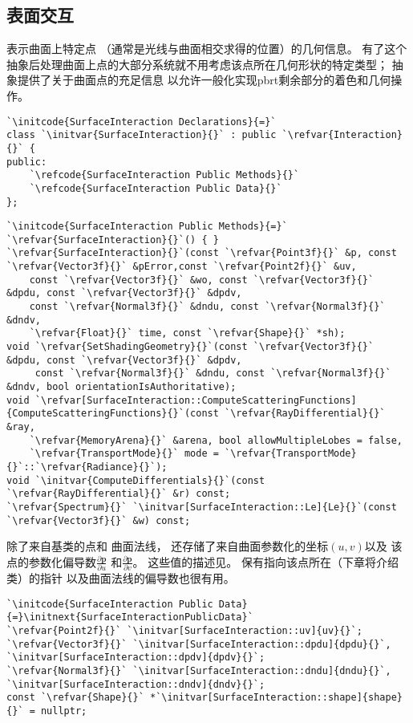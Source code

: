 \subsection{表面交互}\label{sub:表面交互}
表示曲面上特定点
（通常是光线与曲面相交求得的位置）的几何信息。
有了这个抽象后处理曲面上点的大部分系统就不用考虑该点所在几何形状的特定类型；
抽象提供了关于曲面点的充足信息
以允许一般化实现pbrt剩余部分的着色和几何操作。
\begin{lstlisting}
`\initcode{SurfaceInteraction Declarations}{=}`
class `\initvar{SurfaceInteraction}{}` : public `\refvar{Interaction}{}` {
public:
    `\refcode{SurfaceInteraction Public Methods}{}`
    `\refcode{SurfaceInteraction Public Data}{}`
};
\end{lstlisting}
\begin{lstlisting}
`\initcode{SurfaceInteraction Public Methods}{=}`
`\refvar{SurfaceInteraction}{}`() { }
`\refvar{SurfaceInteraction}{}`(const `\refvar{Point3f}{}` &p, const `\refvar{Vector3f}{}` &pError,const `\refvar{Point2f}{}` &uv,
    const `\refvar{Vector3f}{}` &wo, const `\refvar{Vector3f}{}` &dpdu, const `\refvar{Vector3f}{}` &dpdv,
    const `\refvar{Normal3f}{}` &dndu, const `\refvar{Normal3f}{}` &dndv,
    `\refvar{Float}{}` time, const `\refvar{Shape}{}` *sh);
void `\refvar{SetShadingGeometry}{}`(const `\refvar{Vector3f}{}` &dpdu, const `\refvar{Vector3f}{}` &dpdv,
     const `\refvar{Normal3f}{}` &dndu, const `\refvar{Normal3f}{}` &dndv, bool orientationIsAuthoritative);
void `\refvar[SurfaceInteraction::ComputeScatteringFunctions]{ComputeScatteringFunctions}{}`(const `\refvar{RayDifferential}{}` &ray,
    `\refvar{MemoryArena}{}` &arena, bool allowMultipleLobes = false,
    `\refvar{TransportMode}{}` mode = `\refvar{TransportMode}{}`::`\refvar{Radiance}{}`);
void `\initvar{ComputeDifferentials}{}`(const `\refvar{RayDifferential}{}` &r) const;
`\refvar{Spectrum}{}` `\initvar[SurfaceInteraction::Le]{Le}{}`(const `\refvar{Vector3f}{}` &w) const;
\end{lstlisting}

除了来自基类的点和
曲面法线，
还存储了来自曲面参数化的坐标$(u,v)$以及
该点的参数化偏导数$\displaystyle\frac{\partial \bm p}{\partial u}$
和$\displaystyle\frac{\partial \bm p}{\partial v}$。
这些值的描述见。
保有指向该点所在（下章将介绍类）的指针
以及曲面法线的偏导数也很有用。
\begin{lstlisting}
`\initcode{SurfaceInteraction Public Data}{=}\initnext{SurfaceInteractionPublicData}`
`\refvar{Point2f}{}` `\initvar[SurfaceInteraction::uv]{uv}{}`;
`\refvar{Vector3f}{}` `\initvar[SurfaceInteraction::dpdu]{dpdu}{}`, `\initvar[SurfaceInteraction::dpdv]{dpdv}{}`;
`\refvar{Normal3f}{}` `\initvar[SurfaceInteraction::dndu]{dndu}{}`, `\initvar[SurfaceInteraction::dndv]{dndv}{}`;
const `\refvar{Shape}{}` *`\initvar[SurfaceInteraction::shape]{shape}{}` = nullptr;
\end{lstlisting}

